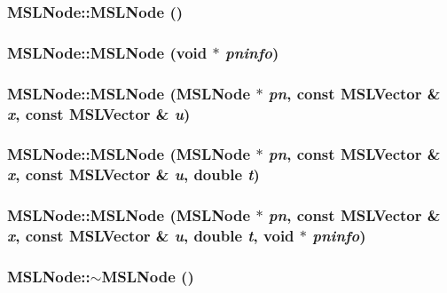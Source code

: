 \subsubsection{\setlength{\rightskip}{0pt plus 5cm}MSLNode::MSLNode ()}\label{classMSLNode_a11}


\subsubsection{\setlength{\rightskip}{0pt plus 5cm}MSLNode::MSLNode (void $\ast$ {\em pninfo})}\label{classMSLNode_a12}


\subsubsection{\setlength{\rightskip}{0pt plus 5cm}MSLNode::MSLNode (MSLNode $\ast$ {\em pn}, const {\bf MSLVector} \& {\em x}, const {\bf MSLVector} \& {\em u})}\label{classMSLNode_a13}


\subsubsection{\setlength{\rightskip}{0pt plus 5cm}MSLNode::MSLNode (MSLNode $\ast$ {\em pn}, const {\bf MSLVector} \& {\em x}, const {\bf MSLVector} \& {\em u}, double {\em t})}\label{classMSLNode_a14}


\subsubsection{\setlength{\rightskip}{0pt plus 5cm}MSLNode::MSLNode (MSLNode $\ast$ {\em pn}, const {\bf MSLVector} \& {\em x}, const {\bf MSLVector} \& {\em u}, double {\em t}, void $\ast$ {\em pninfo})}\label{classMSLNode_a15}


\subsubsection{\setlength{\rightskip}{0pt plus 5cm}MSLNode::$\sim$MSLNode ()\hspace{0.3cm}{\tt  [inline]}}\label{classMSLNode_a16}




